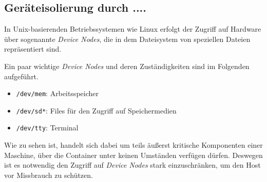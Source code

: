 \documentclass[../main.tex]{subfiles}
\begin{document}

    \subsection{Geräteisolierung durch ....}

			In Unix-basierenden Betriebssystemen wie Linux erfolgt der Zugriff auf Hardware über sogenannte \emph{Device Nodes}, die in dem Dateisystem von speziellen Dateien repräsentiert sind.

			Ein paar wichtige \emph{Device Nodes} und deren Zuständigkeiten sind im Folgenden aufgeführt.

			\begin{itemize}
				\item \texttt{/dev/mem}: Arbeitsspeicher
				\item \texttt{/dev/sd*}: Files für den Zugriff auf Speichermedien
				\item \texttt{/dev/tty}: Terminal
			\end{itemize}

			Wie zu sehen ist, handelt sich dabei um teils äußerst kritische Komponenten einer Maschine, über die Container unter keinen Umständen verfügen dürfen. Deswegen ist es notwendig den Zugriff auf \emph{Device Nodes} stark einzuschränken, um den Host vor Missbrauch zu schützen.


			\cite[S.4]{dockerSec1}

\end{document}
